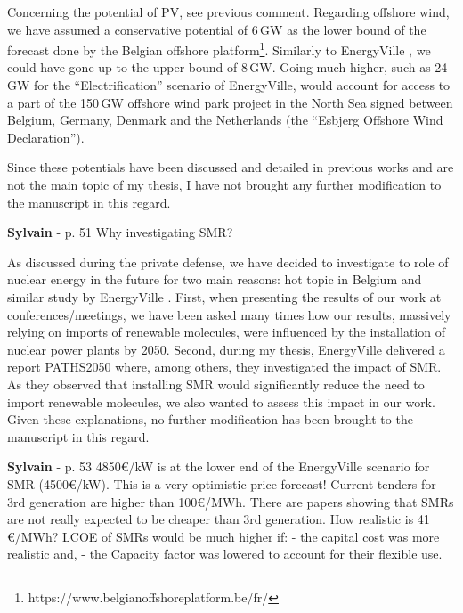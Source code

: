 \documentclass[12pt,a4paper]{article}
\begin{document}
\noindent Concerning the potential of PV, see previous comment. Regarding offshore wind, we have assumed a conservative potential of 6\,GW as the lower bound of the forecast done by the Belgian offshore platform\footnote{https://www.belgianoffshoreplatform.be/fr/}. Similarly to EnergyVille \cite{PATHS2050}, we could have gone up to the upper bound of 8\,GW. Going much higher, such as 24\,GW for the ``Electrification'' scenario of EnergyVille, would account for access to a part of the 150\,GW offshore wind park project in the North Sea signed between Belgium, Germany, Denmark and the Netherlands (the ``Esbjerg Offshore Wind Declaration''). 

\noindent Since these potentials have been discussed and detailed in previous works and are not the main topic of my thesis, I have not brought any further modification to the manuscript in this regard.

\begin{mdframed}[style=comment] %
{\color{purple} \textbf{Sylvain}} - p. 51 Why investigating SMR?
\end{mdframed}

\noindent As discussed during the private defense, we have decided to investigate to role of nuclear energy in the future for two main reasons: hot topic in Belgium and similar study by EnergyVille \cite{PATHS2050}. First, when presenting the results of our work at conferences/meetings, we have been asked many times how our results, massively relying on imports of renewable molecules, were influenced by the installation of nuclear power plants by 2050. Second, during my thesis, EnergyVille delivered a report PATHS2050 where, among others, they investigated the impact of SMR. As they observed that installing SMR would significantly reduce the need to import renewable molecules, we also wanted to assess this impact in our work. Given these explanations, no further modification has been brought to the manuscript in this regard.

\begin{mdframed}[style=comment] %
{\color{purple} \textbf{Sylvain}} - p. 53 4850€/kW is at the lower end of the EnergyVille scenario for SMR (4500€/kW). This is a very optimistic price forecast! Current tenders for 3rd generation are higher than 100€/MWh. There are papers showing that SMRs are not really expected to be cheaper than 3rd generation. How realistic is 41 €/MWh? LCOE of SMRs would be much higher if: - the capital cost was more realistic and, - the Capacity factor was lowered to account for their flexible use.
\end{mdframed}
\end{document}
